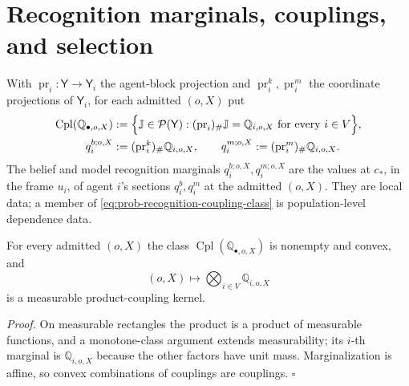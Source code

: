 \section{Recognition marginals, couplings, and selection}
\label{sec:prob-marginals}

With $\operatorname{pr}_i:\mathsf Y\to\mathsf Y_i$ the agent-block projection and
$\operatorname{pr}_i^k,\operatorname{pr}_i^m$ the coordinate projections of $\mathsf Y_i$, for each admitted
$(o,X)$ put
\begin{align}
\operatorname{Cpl}(\mathbb Q_{\bullet,o,X})
&:=\Bigl\{\mathbb J\in\mathcal P(\mathsf Y):(\operatorname{pr}_i)_\#\mathbb J=\mathbb Q_{i,o,X}\text{ for every }i\in V\Bigr\},
\label{eq:prob-recognition-coupling-class}\\
q_i^{b;o,X}&:=(\operatorname{pr}_i^k)_\#\mathbb Q_{i,o,X},
\qquad
q_i^{m;o,X}:=(\operatorname{pr}_i^m)_\#\mathbb Q_{i,o,X}.
\label{eq:prob-recognition-marginals}
\end{align}
The belief and model recognition marginals $q_i^{b;o,X},q_i^{m;o,X}$ are the values at $c_*$, in the frame
$u_i$, of agent $i$'s sections $q_i^b,q_i^m$ at the admitted $(o,X)$. They are local data; a member of
\eqref{eq:prob-recognition-coupling-class} is population-level dependence data.

For every admitted $(o,X)$ the class $\operatorname{Cpl}(\mathbb Q_{\bullet,o,X})$ is nonempty and convex,
and
\begin{equation}
(o,X)\longmapsto\bigotimes_{i\in V}\mathbb Q_{i,o,X}
\label{eq:prob-product-coupling-kernel}
\end{equation}
is a measurable product-coupling kernel. 

\noindent\emph{Proof.}
On measurable rectangles the product is a product of measurable functions, and a monotone-class argument
extends measurability; its $i$-th marginal is $\mathbb Q_{i,o,X}$ because the other factors have unit
mass. Marginalization is affine, so convex combinations of couplings are couplings. \hfill$\square$

